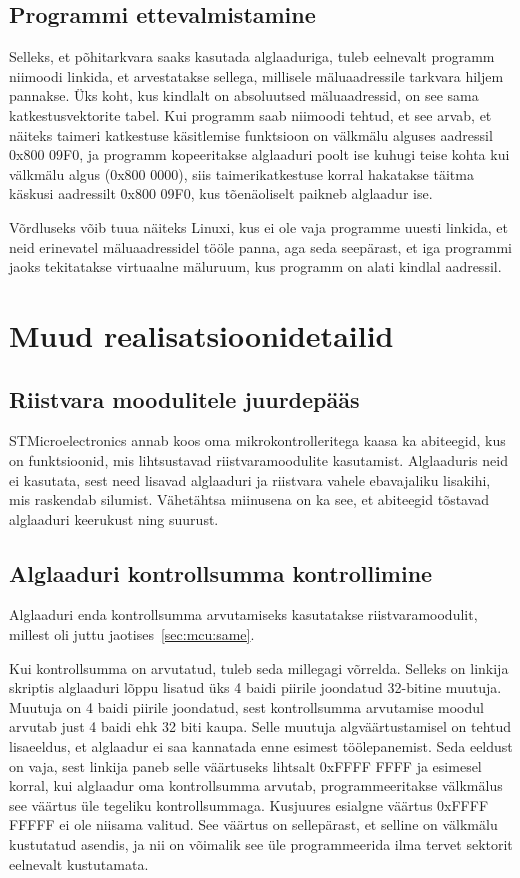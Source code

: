 \documentclass[12pt,a4paper]{article}
\begin{document}
\subsection{Programmi ettevalmistamine}
\label{sec:boot:prep}
Selleks, et põhitarkvara saaks kasutada alglaaduriga, tuleb eelnevalt programm
niimoodi linkida, et arvestatakse sellega, millisele mäluaadressile tarkvara
hiljem pannakse. Üks koht, kus kindlalt on absoluutsed mäluaadressid, on see
sama katkestusvektorite tabel. Kui programm saab niimoodi tehtud, et see arvab,
et näiteks taimeri katkestuse käsitlemise funktsioon on välkmälu alguses
aadressil 0x800 09F0, ja programm kopeeritakse alglaaduri poolt ise kuhugi teise
kohta kui välkmälu algus (0x800 0000), siis taimerikatkestuse korral hakatakse
täitma käskusi aadressilt 0x800 09F0, kus tõenäoliselt paikneb alglaadur ise.

Võrdluseks võib tuua näiteks Linuxi, kus ei ole vaja programme uuesti linkida,
et neid erinevatel mäluaadressidel tööle panna, aga seda seepärast, et iga
programmi jaoks tekitatakse virtuaalne mäluruum, kus programm on alati kindlal
aadressil.

\section{Muud realisatsioonidetailid}
\subsection{Riistvara moodulitele juurdepääs}
STMicroelectronics annab koos oma mikrokontrolleritega kaasa ka abiteegid, kus
on funktsioonid, mis lihtsustavad riistvaramoodulite kasutamist. Alglaaduris neid
ei kasutata, sest need lisavad alglaaduri ja riistvara vahele ebavajaliku
lisakihi, mis raskendab silumist. Vähetähtsa miinusena on ka see, et abiteegid
tõstavad alglaaduri keerukust ning suurust.

\subsection{Alglaaduri kontrollsumma kontrollimine}
Alglaaduri enda kontrollsumma arvutamiseks kasutatakse riistvaramoodulit,
millest oli juttu jaotises~\ref{sec:mcu:same}.

Kui kontrollsumma on arvutatud, tuleb seda millegagi võrrelda. Selleks on
linkija skriptis alglaaduri lõppu lisatud üks 4 baidi piirile joondatud
32-bitine muutuja. Muutuja on 4 baidi piirile joondatud, sest kontrollsumma
arvutamise moodul arvutab just 4 baidi ehk 32 biti kaupa. Selle muutuja
algväärtustamisel on tehtud lisaeeldus, et alglaadur ei saa kannatada enne
esimest töölepanemist. Seda eeldust on vaja, sest linkija paneb selle väärtuseks
lihtsalt 0xFFFF FFFF ja esimesel korral, kui alglaadur oma kontrollsumma
arvutab, programmeeritakse välkmälus see väärtus üle tegeliku kontrollsummaga.
Kusjuures esialgne väärtus 0xFFFF FFFFF ei ole niisama valitud. See väärtus on
sellepärast, et selline on välkmälu kustutatud asendis, ja nii on võimalik see
üle programmeerida ilma tervet sektorit eelnevalt kustutamata.
\end{document}
